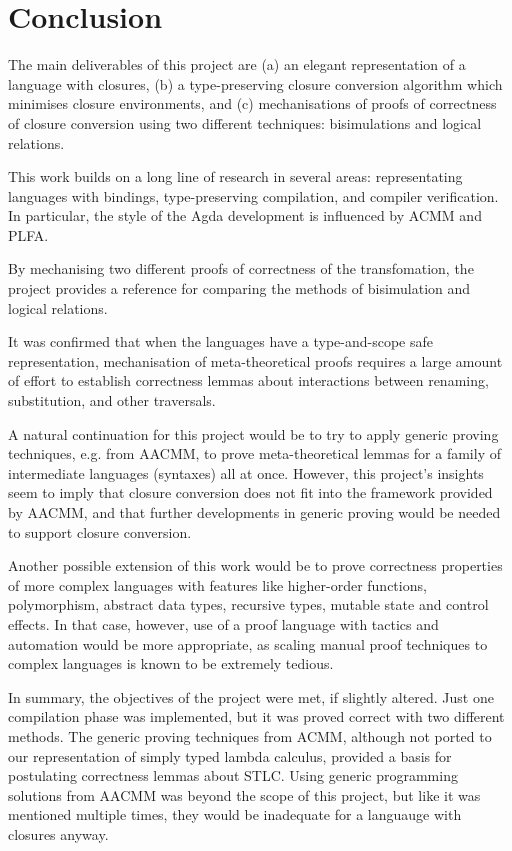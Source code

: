 \documentclass[bsc,frontabs,oneside,singlespacing,parskip,deptreport]{infthesis}
\theoremstyle{definition}
\theoremstyle{lemma}
\begin{document}

\chapter{Conclusion}
\label{cha:conclusion}

The main deliverables of this project are (a) an elegant
representation of a language with closures, (b) a type-preserving
closure conversion algorithm which minimises closure environments, and
(c) mechanisations of proofs of correctness of closure conversion
using two different techniques: bisimulations and logical relations.

This work builds on a long line of research in several areas:
representating languages with bindings, type-preserving
compilation, and compiler verification. In particular, the style of
the Agda development is influenced by ACMM and PLFA.

By mechanising two different proofs of correctness of the
transfomation, the project provides a reference for comparing the
methods of bisimulation and logical relations.

It was confirmed that when the languages have a type-and-scope safe
representation, mechanisation of meta-theoretical proofs requires a
large amount of effort to establish correctness lemmas about
interactions between renaming, substitution, and other traversals.

A natural continuation for this project would be to try to apply
generic proving techniques, e.g. from AACMM, to prove meta-theoretical
lemmas for a family of intermediate languages (syntaxes) all at
once. However, this project's insights seem to imply that closure
conversion does not fit into the framework provided by AACMM, and that
further developments in generic proving would be needed to support
closure conversion.

Another possible extension of this work would be to prove correctness
properties of more complex languages with features like higher-order
functions, polymorphism, abstract data types, recursive types, mutable
state and control effects. In that case, however, use of a proof
language with tactics and automation would be more appropriate, as
scaling manual proof techniques to complex languages is known to be
extremely tedious.

In summary, the objectives of the project were met, if slightly
altered. Just one compilation phase was implemented, but it was proved
correct with two different methods. The generic proving techniques
from ACMM, although not ported to our representation of simply typed
lambda calculus, provided a basis for postulating correctness lemmas
about STLC. Using generic programming solutions from AACMM was beyond
the scope of this project, but like it was mentioned multiple times,
they would be inadequate for a languauge with closures anyway.
\end{document}

